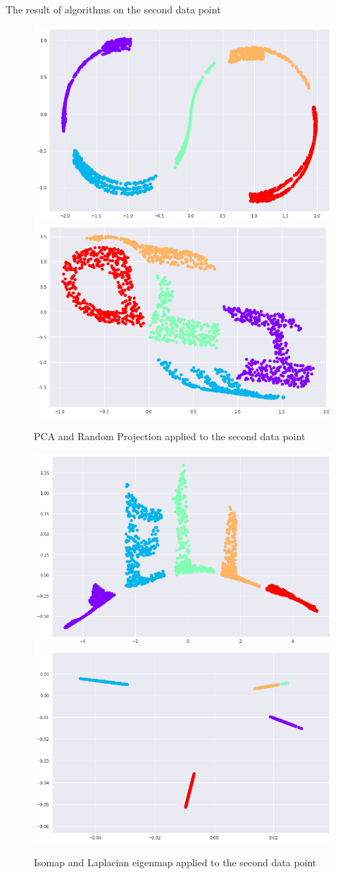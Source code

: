 \documentclass[10pt]{beamer}
\begin{document}
\begin{frame}{The result of algorithms on the second data point}
 \begin{figure}[t]
\centering
\includegraphics[width=.4\textwidth]{pca_part2.png}\hfill
\includegraphics[width=.4\textwidth]{random_projection_part2.png}
\caption{PCA and Random Projection applied to the second data point}
\end{figure}

\begin{figure}[b]
\centering
\includegraphics[width=.4\textwidth]{isomap_part2.png}\hfill
\includegraphics[width=.4\textwidth]{laplacian_part2.png}
\caption{Isomap and Laplacian eigenmap applied to the second data point}
\end{figure}

\end{frame}
\end{document}
